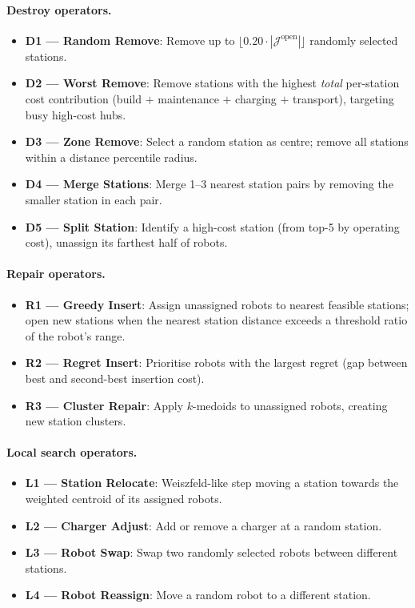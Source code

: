 \documentclass[11pt,a4paper]{article}
\begin{document}
\paragraph{Destroy operators.}
\begin{itemize}[nosep]
  \item \textbf{D1 --- Random Remove}: Remove up to $\lfloor 0.20 \cdot |\mathcal{J}^{\text{open}}| \rfloor$ randomly selected stations.
  \item \textbf{D2 --- Worst Remove}: Remove stations with the highest \emph{total} per-station cost contribution (build $+$ maintenance $+$ charging $+$ transport), targeting busy high-cost hubs.
  \item \textbf{D3 --- Zone Remove}: Select a random station as centre; remove all stations within a distance percentile radius.
  \item \textbf{D4 --- Merge Stations}: Merge 1--3 nearest station pairs by removing the smaller station in each pair.
  \item \textbf{D5 --- Split Station}: Identify a high-cost station (from top-5 by operating cost), unassign its farthest half of robots.
\end{itemize}

\paragraph{Repair operators.}
\begin{itemize}[nosep]
  \item \textbf{R1 --- Greedy Insert}: Assign unassigned robots to nearest feasible stations; open new stations when the nearest station distance exceeds a threshold ratio of the robot's range.
  \item \textbf{R2 --- Regret Insert}: Prioritise robots with the largest regret (gap between best and second-best insertion cost).
  \item \textbf{R3 --- Cluster Repair}: Apply $k$-medoids to unassigned robots, creating new station clusters.
\end{itemize}

\paragraph{Local search operators.}
\begin{itemize}[nosep]
  \item \textbf{L1 --- Station Relocate}: Weiszfeld-like step moving a station towards the weighted centroid of its assigned robots.
  \item \textbf{L2 --- Charger Adjust}: Add or remove a charger at a random station.
  \item \textbf{L3 --- Robot Swap}: Swap two randomly selected robots between different stations.
  \item \textbf{L4 --- Robot Reassign}: Move a random robot to a different station.
\end{itemize}
\end{document}
